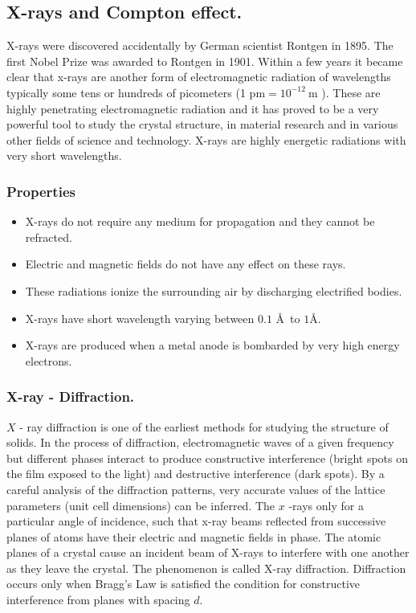 \subsection{X-rays and Compton effect.}
X-rays were discovered accidentally by German scientist Rontgen in 1895. The first Nobel Prize was awarded to Rontgen in 1901. Within a few years it became clear that x-rays are another form of electromagnetic radiation of wavelengths typically some tens or hundreds of picometers (1 $\mathrm{pm}=10^{-12} \mathrm{~m}$ ). These are  highly penetrating electromagnetic radiation and it has proved to be a very powerful tool to study the crystal structure, in material research and in various other fields of science and technology. X-rays are highly energetic radiations with very short wavelengths.
\subsubsection{Properties}
\begin{itemize}
	
	\item  X-rays do not require any medium for propagation and they cannot be refracted.
	\item  Electric and magnetic fields do not have any effect on these rays.
	\item  These radiations ionize the surrounding air by discharging electrified bodies.
	\item   X-rays have short wavelength varying between $0.1 $ \AA \ to $1 $\AA.
	\item   X-rays are produced when a metal anode is bombarded by very high energy electrons.
\end{itemize}
\subsubsection{X-ray - Diffraction.}
$X$ - ray diffraction is one of the earliest methods for studying the structure of solids. In the process of diffraction, electromagnetic waves of a given frequency but different phases interact to produce constructive interference (bright spots on the film exposed to the light) and destructive interference (dark spots). By a careful analysis of the diffraction patterns, very accurate values of the lattice parameters (unit cell dimensions) can be inferred.
The $x$ -rays only for a particular angle of incidence, such that x-ray beams reflected from successive planes of atoms have their electric and magnetic fields in phase.
The atomic planes of a crystal cause an incident beam of X-rays to interfere with one another as they leave the crystal. The phenomenon is called X-ray diffraction. Diffraction occurs only when Bragg's Law is satisfied the condition for constructive interference  from planes with spacing ${d}$.
